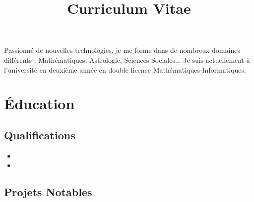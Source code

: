 \documentclass[11pt,a4paper,sans]{moderncv}        %
\title{Curriculum Vitae}                               %
\begin{document}
\makecvtitle

\small{Passionné de nouvelles technologies, je me forme dans de nombreux domaines différents : Mathématiques, Astrologie, Sciences Sociales... Je suis actuellement à l'université en deuxième année en double licence Mathématiques-Informatiques.}

\section{Éducation}

\vspace{5pt}

\subsection{Qualifications}

\vspace{5pt}

\begin{itemize}
	
	\item{}
	
	\item{}
	
\end{itemize}

\vspace{2pt}

\subsection{Projets Notables}

\vspace{5pt}
\end{document}

